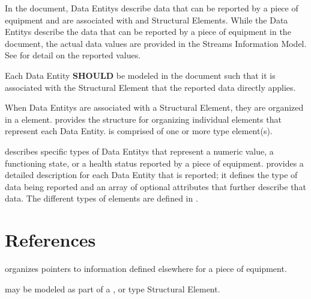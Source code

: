 In the  document, \glspl{Data Entity} describe data that can be reported by a piece of equipment and are associated with  and  \glspl{Structural Element}.   While the \glspl{Data Entity} describe the data that can be reported by a piece of equipment in the  document, the actual data values are provided in the \gls{Streams Information Model}.   See  for detail on the reported values.

Each \gls{Data Entity} \textbf{SHOULD} be modeled in the  document such that it is associated with the \gls{Structural Element} that the reported data directly applies.

When \glspl{Data Entity} are associated with a \gls{Structural Element}, they are organized in a  element.    provides the structure for organizing individual  elements that represent each \gls{Data Entity}.  is comprised of one or more  type element(s).

 describes specific types of \glspl{Data Entity} that represent a numeric value, a functioning state, or a health status reported by a piece of equipment.  provides a detailed description for each \gls{Data Entity} that is reported; it defines the type of data being reported and an array of optional attributes that further describe that data.   The different types of  elements are defined in .











\section{References}
\label{sec:References}

 organizes pointers to information defined elsewhere for a piece of equipment.

 may be modeled as part of a ,  or  type \gls{Structural Element}.

